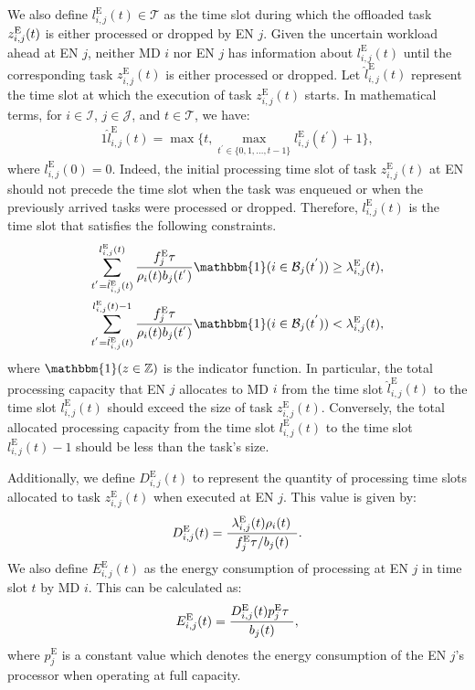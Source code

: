 \documentclass[10pt, journal,letterpaper]{IEEEtran}
\begin{document}
We also define $l_{i,j}^{\text{E}}(t) \in \mathcal{T}$ as the time slot during which the offloaded task $z_{i,j}^{\text{\text{E}}}(t)$ is either processed or dropped by EN $j$. Given the uncertain workload ahead at EN $j$, neither MD $i$ nor EN $j$ has information about $l_{i,j}^{\text{E}}(t)$ until the corresponding task $z_{i,j}^{\text{E}}(t)$ is either processed or dropped. Let $\hat{l}_{i,j}^{\text{E}}(t)$ represent the time slot at which the execution of task $z_{i,j}^{\text{E}}(t)$ starts. In mathematical terms, for $i \in \mathcal{I}$, $j \in \mathcal{J}$, and $t \in \mathcal{T}$, we have:
\begin{alignat}{1}
	\hat{l}_{i,j}^{\text{E}}(t) = \max \{t, \max \limits_{t^{'} \in \{0,1,\ldots,t-1\}} l_{i,j}^{\text{E}}(t^{'})+1\},
	\label{11}  
\end{alignat}
where $l_{i,j}^{\text{E}}(0) = 0$. Indeed, the initial processing time slot of task $z_{i,j}^{\text{E}}(t)$ at EN should not precede the time slot when the task was enqueued or when the previously arrived tasks were processed or dropped. Therefore, $l_{i,j}^{\text{E}}(t)$ is the time slot that satisfies the following constraints. %
\begin{alignat}{1}
	\sum_{t^{'}=\hat{l}_{i,j}^{\text{E}}(t)}^{l_{i,j}^{\text{E}}(t)}{f_j^{\text{E}}\tau \over \rho_i(t)b_j(t^{'})}\mathbbm{1}(i \in \mathcal{B}_j(t^{'}))  \geq   \lambda_{i,j}^{\text{E}}(t),
	\label{12}  \\
	\sum_{t^{'}=\hat{l}_{i,j}^{\text{E}}(t)}^{l_{i,j}^{\text{E}}(t)-1}{f_j^{\text{E}}\tau \over \rho_i(t)b_j(t^{'})}\mathbbm{1}(i \in \mathcal{B}_j(t^{'})) < \lambda_{i,j}^{\text{E}}(t),
	\label{13}  
\end{alignat}
where $\mathbbm{1} (z \in \mathbb{Z})$ is the indicator function. In particular, the total processing capacity that EN $j$ allocates to MD $i$ from the time slot $\hat{l}_{i,j}^{\text{E}}(t)$ to the time slot $l_{i,j}^{\text{E}}(t)$ should exceed the size of task $z_{i,j}^{\text{E}}(t)$. Conversely, the total allocated processing capacity from the time slot $l_{i,j}^{\text{E}}(t)$ to the time slot $l_{i,j}^{\text{E}}(t)-1$ should be less than the task's size.

Additionally, we define $D_{i,j}^{\text{E}}(t)$ to represent the quantity of processing time slots allocated to task $z_{i,j}^{\text{E}}(t)$ when executed at EN $j$. This value is given by:
\begin{alignat}{1}
	D_{i,j}^{\text{E}}(t) =  {\,\, \lambda_{i,j}^{\text{E}}(t) \rho_i(t) \,\,\, \over f_j^{\text{E}} \tau /  b_j(t)}.
	\label{14}  
\end{alignat}
We also define $E_{i,j}^{\text{E}}(t)$ as the energy consumption of processing at EN $j$ in time slot $t$ by MD $i$. This can be calculated as:
\begin{alignat}{1}
	E_{i,j}^{\text{E}}(t) =  { D_{i,j}^{\text{E}}(t)  p_j^{\text{E}} \tau \,\, \over b_j(t)},  %
	\label{15}  
\end{alignat}
where $p_j^{\text{E}}$ is a constant value which denotes the energy consumption of the EN $j$'s processor when operating at full capacity. 
\end{document}
